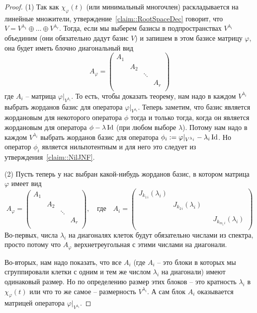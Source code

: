 \begin{proof}
(1) Так как $\chi_\varphi(t)$ (или минимальный многочлен) раскладывается на линейные множители, утверждение~\ref{claim::RootSpaceDec} говорит, что $V = V^{\lambda_1}\oplus \ldots\oplus V^{\lambda_r}$.
Тогда, если мы выберем базисы в подпространствах $V^{\lambda_i}$ объединим (они обязательно дадут базис $V$) и запишем в этом базисе матрицу $\varphi$, она будет иметь блочно диагональный вид
\[
A_\varphi = 
\begin{pmatrix}
{A_1}&{}&{}&{}\\
{}&{A_2}&{}&{}\\
{}&{}&{\ddots}&{}\\
{}&{}&{}&{A_r}\\
\end{pmatrix}
\]
где $A_i$ -- матрица $\varphi|_{V^{\lambda_i}}$.
То есть, чтобы доказать теорему, нам надо в каждом $V^{\lambda_i}$ выбрать жорданов базис для оператора $\varphi|_{V^{\lambda_i}}$.
Теперь заметим, что базис является жордановым для некоторого оператора $\phi$ тогда и только тогда, когда он является жордановым для оператора $\phi - \lambda \operatorname{Id}$ (при любом выборе $\lambda$).
Потому нам надо в каждом $V^{\lambda_i}$ выбрать жорданов базис для оператора $\phi_i := \varphi|_{V^{\lambda_i}} - \lambda_i \operatorname{Id}$.
Но оператор $\phi_i$ является нильпотентным и для него это следует из утверждения~\ref{claim::NilJNF}.

(2) Пусть теперь у нас выбран какой-нибудь жорданов базис, в котором матрица $\varphi$ имеет вид
\[
A_\varphi = 
\begin{pmatrix}
{A_1}&{}&{}&{}\\
{}&{A_2}&{}&{}\\
{}&{}&{\ddots}&{}\\
{}&{}&{}&{A_r}\\
\end{pmatrix},
\quad\text{где}\quad
A_i = 
\begin{pmatrix}
{J_{k_{1\,i}}(\lambda_i)}&{}&{}&{}\\
{}&{J_{k_{2\,i}}(\lambda_i)}&{}&{}\\
{}&{}&{}&{}\\
{}&{}&{}&{J_{k_{m_i\,i}}(\lambda_i)}\\
\end{pmatrix}
\]
Во-первых, числа $\lambda_i$ на диагоналях клеток будут обязательно числами из спектра, просто потому что $A_\varphi$ верхнетреугольная с этими числами на диагонали.

Во-вторых, нам надо показать, что все $A_i$ (где $A_i$ -- это блоки в которых мы сгруппировали клетки с одним и тем же числом $\lambda_i$ на диагонали) имеют одинаковый размер.
Но по определению размер этих блоков -- это кратность $\lambda_i$ в $\chi_\varphi(t)$ или что то же самое -- размерность $V^{\lambda_i}$.
А сам блок $A_i$ оказывается матрицей оператора $\varphi|_{V^{\lambda_i}}$.


\end{proof}
